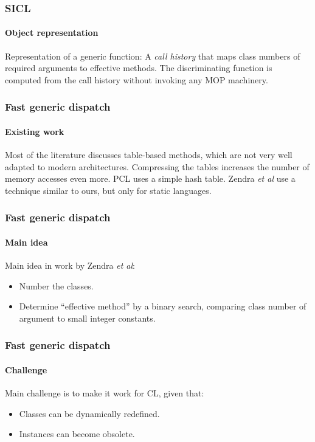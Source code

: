 \documentclass{beamer}
\begin{document}
\begin{frame}
  \frametitle{SICL}
  \framesubtitle{Object representation}

  Representation of a generic function:
  \vskip 0.25cm
  A \emph{call history} that maps class numbers of required arguments
  to effective methods. 
  \vskip 0.25cm
  The discriminating function is computed from the call history
  without invoking any MOP machinery. 

\end{frame}
\begin{frame}
  \frametitle{Fast generic dispatch}
  \framesubtitle{Existing work}

  Most of the literature discusses table-based methods, which are not
  very well adapted to modern architectures.  Compressing the tables
  increases the number of memory accesses even more.
  \vskip 0.5cm
  PCL uses a simple hash table.
  \vskip 0.5cm
  Zendra \emph{et al} use a technique similar to ours, but only for
  static languages.

\end{frame}
\begin{frame}
  \frametitle{Fast generic dispatch}
  \framesubtitle{Main idea}

  Main idea in work by Zendra \emph{et al}:

  \begin{itemize}
  \item Number the classes.
  \item Determine ``effective method'' by a binary search, comparing
    class number of argument to small integer constants.
  \end{itemize}

\end{frame}
\begin{frame}
  \frametitle{Fast generic dispatch}
  \framesubtitle{Challenge}

  Main challenge is to make it work for CL, given that:

  \begin{itemize}
  \item Classes can be dynamically redefined.
  \item Instances can become obsolete.
  \end{itemize}

\end{frame}
\end{document}
